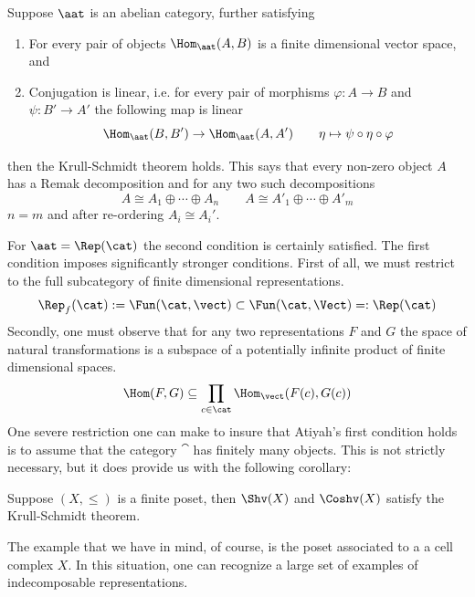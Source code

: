 \begin{thm}
	Suppose $\aat$ is an abelian category, further satisfying
	\begin{enumerate}
		\item For every pair of objects $\Hom_{\aat}(A,B)$ is a finite dimensional vector space, and
		\item Conjugation is linear, i.e. for every pair of morphisms $\varphi:A\to B$ and $\psi:B'\to A'$ the following map is linear
		\[
			\Hom_{\aat}(B,B')\to \Hom_{\aat}(A,A') \qquad \eta\mapsto \psi\circ\eta\circ\varphi
		\]
	\end{enumerate}
		then the Krull-Schmidt theorem holds. This says that every non-zero object $A$ has a Remak decomposition and for any two such decompositions
		\[
			A\cong A_1\oplus\cdots\oplus A_n \qquad A\cong A'_1\oplus\cdots\oplus A'_m
		\]
		$n=m$ and after re-ordering $A_i\cong A_i'$.
\end{thm}

For $\aat=\Rep(\cat)$ the second condition is certainly satisfied. The first condition imposes significantly stronger conditions. First of all, we must restrict to the full subcategory of finite dimensional representations.
\[
	\Rep_f(\cat):=\Fun(\cat,\vect) \subset \Fun(\cat,\Vect)=:\Rep(\cat)
\]
Secondly, one must observe that for any two representations $F$ and $G$ the space of natural transformations is a subspace of a potentially infinite product of finite dimensional spaces.
\[
	\Hom(F,G)\subseteq \prod_{c\in\cat}\Hom_{\vect}(F(c),G(c)) 
\]
One severe restriction one can make to insure that Atiyah's first condition holds is to assume that the category $\cat$ has finitely many objects. This is not strictly necessary, but it does provide us with the following corollary:

\begin{cor}\label{cor:sheaves_remak}
	Suppose $(X,\leq)$ is a finite poset, then $\Shv(X)$ and $\Coshv(X)$ satisfy the Krull-Schmidt theorem.
\end{cor}

The example that we have in mind, of course, is the poset associated to a a cell complex $X$. In this situation, one can recognize a large set of examples of indecomposable representations.

